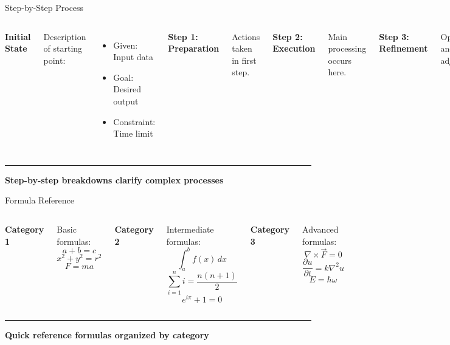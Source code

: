 \documentclass[8pt,aspectratio=169]{beamer}
\newcommand{\bottomnote}[1]{%
\vfill
\vspace{-2mm}
\textcolor{mllavender2}{\rule{\textwidth}{0.4pt}}
\vspace{1mm}
\footnotesize
\textbf{#1}
}
\begin{document}
\begin{frame}[t]{Step-by-Step Process}
\begin{columns}[T]
\textbf{Initial State}

Description of starting point:
\begin{itemize}
\item Given: Input data
\item Goal: Desired output
\item Constraint: Time limit
\end{itemize}

\vspace{0.5em}
\textbf{Step 1: Preparation}

Actions taken in first step.

\vspace{0.5em}
\textbf{Step 2: Execution}

Main processing occurs here.

\textbf{Step 3: Refinement}

Optimization and adjustments.

\vspace{0.5em}
\textbf{Step 4: Validation}

Check results against criteria.

\vspace{0.5em}
\textbf{Final State}

Description of outcome:
\begin{itemize}
\item Result: \textcolor{mlgreen}{Success}
\item Time: 2.3 seconds
\item Accuracy: 99.5\%
\end{itemize}
\end{columns}

\bottomnote{Step-by-step breakdowns clarify complex processes}
\end{frame}

\begin{frame}[t]{Formula Reference}
\begin{columns}[T]
\textbf{Category 1}

Basic formulas:
$$a + b = c$$
$$x^2 + y^2 = r^2$$
$$F = ma$$

\textbf{Category 2}

Intermediate formulas:
$$\int_a^b f(x)\,dx$$
$$\sum_{i=1}^n i = \frac{n(n+1)}{2}$$
$$e^{i\pi} + 1 = 0$$

\textbf{Category 3}

Advanced formulas:
$$\nabla \times \vec{F} = 0$$
$$\frac{\partial u}{\partial t} = k\nabla^2 u$$
$$E = \hbar\omega$$
\end{columns}

\bottomnote{Quick reference formulas organized by category}
\end{frame}
\end{document}
